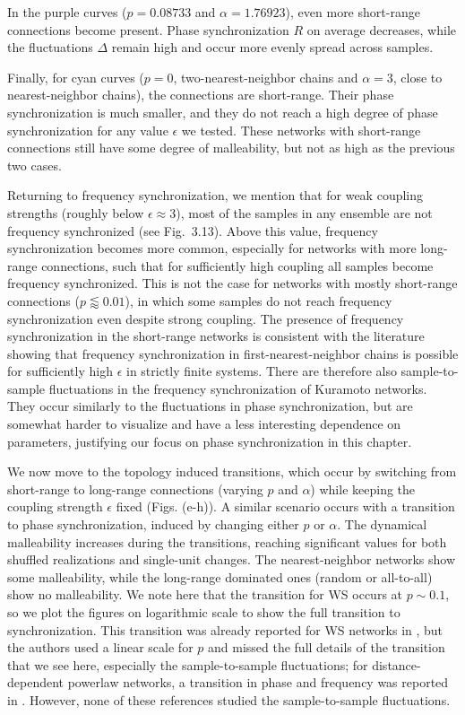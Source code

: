 In the purple curves ($p = 0.08733$ and $\alpha=1.76923$), even more short-range connections become present. Phase synchronization $R$ on average decreases, while the fluctuations $\Delta$ remain high and occur more evenly spread across samples.

Finally, for cyan curves ($p = 0$, two-nearest-neighbor chains and $\alpha = 3$, close to nearest-neighbor chains), the connections are short-range. Their phase synchronization is much smaller, and they do not reach a high degree of phase synchronization for any value $\epsilon$ we tested.
These networks with short-range connections still have some degree of malleability, but not as high as the previous two cases. 

Returning to frequency synchronization, we mention that for weak coupling strengths (roughly below $\epsilon \approx 3$), most of the samples in any ensemble are not frequency synchronized (see Fig.~3.13). Above this value, frequency synchronization becomes more common, especially for networks with more long-range connections, such that for sufficiently high coupling all samples become frequency synchronized. This is not the case for networks with mostly short-range connections ($p \lessapprox 0.01$), in which some samples do not reach frequency synchronization even despite strong coupling. The presence of frequency synchronization in the short-range networks is consistent with the literature \cite{strogatz1988phase, acebron2005kuramoto} showing that frequency synchronization in first-nearest-neighbor chains is possible for sufficiently high $\epsilon$ in strictly finite systems. There are therefore also sample-to-sample fluctuations in the frequency synchronization of Kuramoto networks. They occur similarly to the fluctuations in phase synchronization, but are somewhat harder to visualize and have a less interesting dependence on parameters, justifying our focus on phase synchronization in this chapter.

We now move to the topology induced transitions, which occur by switching from short-range to long-range connections (varying $p$ and $\alpha$) while keeping the coupling strength $\epsilon$ fixed (Figs. (e-h)). A similar scenario occurs with a transition to phase synchronization, induced by changing either $p$ or $\alpha$. The dynamical malleability increases during the transitions, reaching significant values for both shuffled realizations and single-unit changes. The nearest-neighbor networks show some malleability, while the long-range dominated ones (random or all-to-all) show no malleability. We note here that the transition for WS occurs at $p \sim 0.1$, so we plot the figures on logarithmic scale to show the full transition to synchronization. This transition was already reported for WS networks in \cite{hong2002synchronization}, but the authors used a linear scale for $p$ and missed the full details of the transition that we see here, especially the sample-to-sample fluctuations; for distance-dependent powerlaw networks, a transition in phase and frequency was reported in \cite{rogers1996phasetransitions}. However, none of these references studied the sample-to-sample fluctuations.

